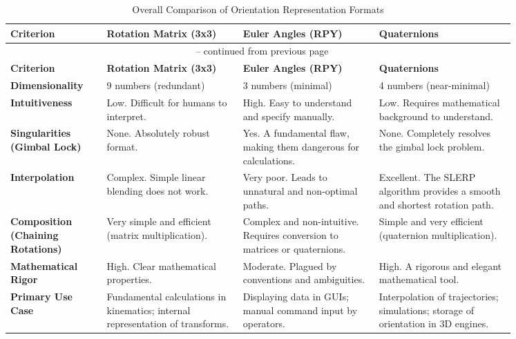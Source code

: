 \renewcommand{\arraystretch}{1.2} %
\begin{longtable}{p{0.16\linewidth} p{0.23\linewidth} p{0.23\linewidth} p{0.23\linewidth}}
    \caption{Overall Comparison of Orientation Representation Formats}\label{tab:orientation_format_comparison}\\
    \toprule %
    \textbf{Criterion} & \textbf{Rotation Matrix (3x3)} & \textbf{Euler Angles (RPY)} & \textbf{Quaternions} \\
    \toprule %
    \endfirsthead

    \multicolumn{4}{c}{\tablename~\thetable{} -- continued from previous page} \\
    \toprule %
    \textbf{Criterion} & \textbf{Rotation Matrix (3x3)} & \textbf{Euler Angles (RPY)} & \textbf{Quaternions} \\
    \toprule %
    \endhead

    \bottomrule %
    \endfoot

    \bottomrule %
    \endlastfoot

    \textbf{Dimensionality} & 9 numbers (redundant) & 3 numbers (minimal) & 4 numbers (near-minimal) \\
    \midrule %
    \textbf{Intuitiveness} & Low. Difficult for humans to interpret. & High. Easy to understand and specify manually. & Low. Requires mathematical background to understand. \\
    \midrule %
    \textbf{Singularities (Gimbal Lock)} & None. Absolutely robust format. & Yes. A fundamental flaw, making them dangerous for calculations. & None. Completely resolves the gimbal lock problem. \\
    \midrule %
    \textbf{Interpolation} & Complex. Simple linear blending does not work. & Very poor. Leads to unnatural and non-optimal paths. & Excellent. The SLERP algorithm provides a smooth and shortest rotation path. \\
    \midrule %
    \textbf{Composition (Chaining Rotations)} & Very simple and efficient (matrix multiplication). & Complex and non-intuitive. Requires conversion to matrices or quaternions. & Simple and very efficient (quaternion multiplication). \\
    \midrule %
    \textbf{Mathematical Rigor} & High. Clear mathematical properties. & Moderate. Plagued by conventions and ambiguities. & High. A rigorous and elegant mathematical tool. \\
    \midrule %
    \textbf{Primary Use Case} & Fundamental calculations in kinematics; internal representation of transforms. & Displaying data in GUIs; manual command input by operators. & Interpolation of trajectories; simulations; storage of orientation in 3D engines. \\
\end{longtable}

